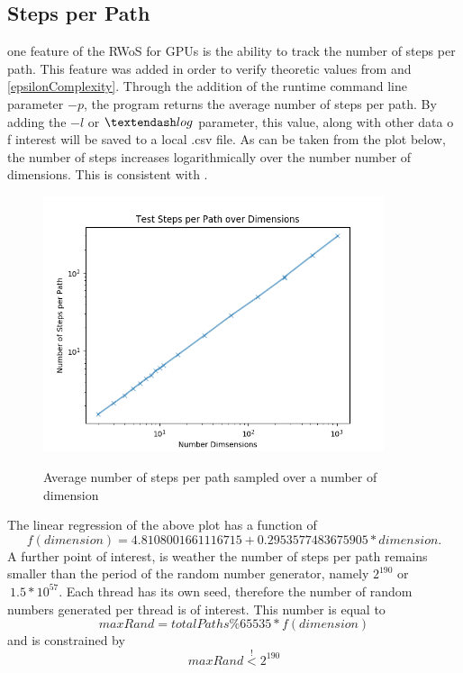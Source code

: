 \subsection{Steps per Path}
one feature of the \Gls{RWoS} for \Glspl{GPU} is the ability to track the number of
steps per path.  This feature was added in order to verify theoretic values from \cite{Bornemann,DeLaurentis} and
\ref{epsilonComplexity}.  Through the addition of the runtime command line parameter
$-p$, the program returns the average number of steps per path.  By adding the $-l$
or $ \textendash log$
parameter, this value, along with other data o f interest will be saved to a local
.csv file.  As can be taken from the plot below, the number of steps increases
logarithmically over the number number of dimensions.  This is consistent with \cite{Bornemann, DeLaurentis}.
\begin{figure}
\begin{center}
\includegraphics[width=10.0cm]{styles/pathsPerDim} \label{plot:pathsPerDim}
  \caption{Average number of steps per path sampled over a number of dimension}
\end{center}
\end{figure}
The linear regression of the above plot has a function of $$f(dimension)= 4.8108001661116715 + 0.2953577483675905*dimension.$$
A further point of interest, is weather the number of steps per path remains smaller
than the period of the random number generator, namely $2^{190}$ or $~1.5 * 10^{57}$.
Each thread has its own seed, therefore the number of random numbers generated per
thread is of interest.  This number is equal to
$$maxRand = total Paths \% 65535 * f(dimension)$$ and is constrained by
$$ maxRand \overset{!}{<} 2^{190}$$


